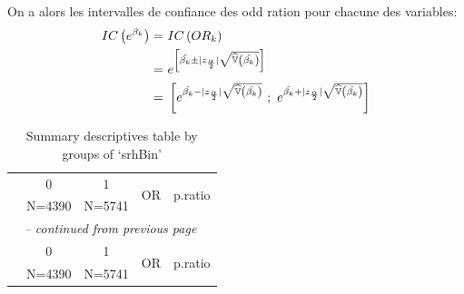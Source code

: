\documentclass{book}
\begin{document}
\noindent
On a alors les intervalles de confiance des odd ration pour chacune des variables:\\
\begin{align*}
IC \left( e^{\beta_k} \right)  =& ~ IC \left( OR_k \right) \\
= & ~ e^{\left[ \hat{\beta_k} \pm |z_{{\alpha} \over {2}}| \sqrt{\widehat{\mathbb{V}}\left( \hat{\beta_k} \right)} \right]} \\
= & ~
 \left[
e^{\hat{\beta_k} - |z_{{\alpha} \over {2}}| \sqrt{\widehat{\mathbb{V}}\left( \hat{\beta_k} \right)}} 
~;~ 
e^{\hat{\beta_k} + |z_{{\alpha} \over {2}}| \sqrt{\widehat{\mathbb{V}}\left( \hat{\beta_k} \right)}} 
\right]
\end{align*}


\newpage

    \begin{longtable}{lcccc}\caption{Summary descriptives table by groups of `srhBin'}\\
    \hline  
     &      0       &      1       & \multirow{2}{*}{       OR       } & \multirow{2}{*}{p.ratio}\\ 
 &    N=4390    &    N=5741    &                  &         \\ 
  
    \hline
    \hline     
    \endfirsthead 
    \multicolumn{5}{l}{\tablename\ \thetable{} \textit{-- continued from previous page}}\\ 
    \hline
     &      0       &      1       & \multirow{2}{*}{       OR       } & \multirow{2}{*}{p.ratio}\\ 
 &    N=4390    &    N=5741    &                  &         \\ 


\end{longtable}
\end{document}
